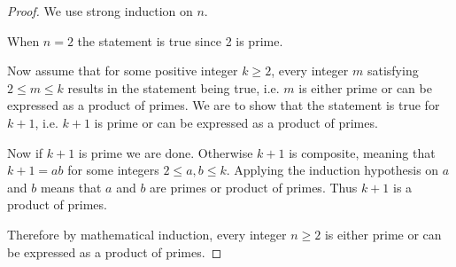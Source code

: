 \begin{questions}
    \item \begin{proof}
        We use strong induction on $n$.

        When $n = 2$ the statement is true since 2 is prime.

        Now assume that for some positive integer $k \geq 2$, every integer $m$ satisfying $2 \leq m \leq k$ results in the statement being true, i.e. $m$ is either prime or can be expressed as a product of primes. We are to show that the statement is true for $k + 1$, i.e. $k+1$ is prime or can be expressed as a product of primes.

        Now if $k + 1$ is prime we are done. Otherwise $k + 1$ is composite, meaning that $k + 1 = ab$ for some integers $2 \leq a,b \leq k$. Applying the induction hypothesis on $a$ and $b$ means that $a$ and $b$ are primes or product of primes. Thus $k + 1$ is a product of primes.

        Therefore by mathematical induction, every integer $n \geq 2$ is either prime or can be expressed as a product of primes.
    \end{proof}

    
        
        

\end{questions}
